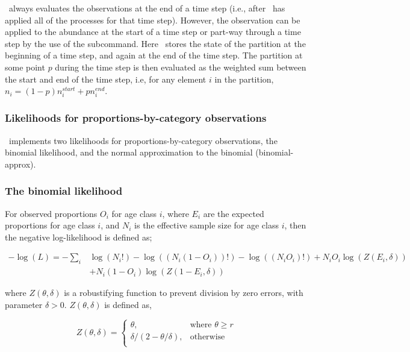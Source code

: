 \SPM\ always evaluates the observations at the end of a time step (i.e., after \SPM\ has applied all of the processes for that time step). However, the observation can be applied to the abundance at the start of a time step or part-way through a time step by the use of the  subcommand. Here \SPM\ stores the state of the partition at the beginning of a time step, and again at the end of the time step. The partition at some point $p$ during the time step is then evaluated as the weighted sum between the start and end of the time step, i.e, for any element $i$ in the partition, $n_i=(1-p) n_i^{start} + p n_i^{end}$.

\subsubsection{Likelihoods for proportions-by-category observations}

\SPM\ implements two likelihoods for proportions-by-category observations, the binomial likelihood, and the normal approximation to the binomial (binomial-approx). 

\subsubsection*{The binomial likelihood}

For observed proportions $O_i$ for age class $i$, where $E_i$ are the expected proportions for age class $i$, and $N_i$ is the effective sample size for age class $i$, then the negative log-likelihood is defined as;  

\begin{equation}
  \begin{split}
    -\log \left(L \right)= -\sum\limits_i & \log \left(N_i! \right) - \log \left(\left(N_i \left(1 - O_i \right) \right)! \right) - \log \left(\left(N_i O_i \right)! \right) + N_i O_i \log \left(Z\left(E_i,\delta \right) \right) \\
    &+ N_i \left(1 - O_i \right)\log \left(Z\left(1 - E_i,\delta\right) \right)
  \end{split}
\end{equation}


where $Z \left(\theta,\delta \right)$ is a robustifying function to prevent division by zero errors, with parameter $\delta>0$. $Z \left(\theta,\delta \right)$ is defined as,

\begin{equation}
   Z \left(\theta,\delta \right) = \begin{cases}
	  \theta, & \text{where $\theta \ge r$} \\
	  \delta/\left( 2-\theta/\delta \right), & \text{otherwise} \\  
  \end{cases}
\end{equation}

